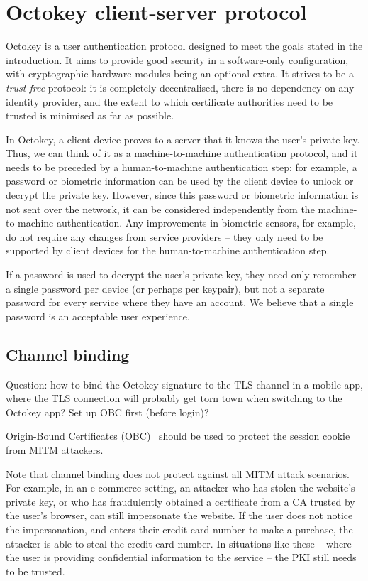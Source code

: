 \section{Octokey client-server protocol}

Octokey is a user authentication protocol designed to meet the goals stated in the introduction. It
aims to provide good security in a software-only configuration, with cryptographic hardware modules
being an optional extra. It strives to be a \emph{trust-free} protocol: it is completely
decentralised, there is no dependency on any identity provider, and the extent to which certificate
authorities need to be trusted is minimised as far as possible.

In Octokey, a client device proves to a server that it knows the user's private key. Thus, we can
think of it as a machine-to-machine authentication protocol, and it needs to be preceded by a
human-to-machine authentication step: for example, a password or biometric information can be used
by the client device to unlock or decrypt the private key. However, since this password or biometric
information is not sent over the network, it can be considered independently from the
machine-to-machine authentication. Any improvements in biometric sensors, for example, do not
require any changes from service providers -- they only need to be supported by client devices for
the human-to-machine authentication step.

If a password is used to decrypt the user's private key, they need only remember a single password
per device (or perhaps per keypair), but not a separate password for every service where they have
an account. We believe that a single password is an acceptable user experience.

\subsection{Channel binding}

Question: how to bind the Octokey signature to the TLS channel in a mobile app, where the TLS
connection will probably get torn town when switching to the Octokey app? Set up OBC first (before
login)?

Origin-Bound Certificates (OBC)~\cite{Dietz12} should be used to protect the session cookie from
MITM attackers.

Note that channel binding does not protect against all MITM attack scenarios. For example, in an
e-commerce setting, an attacker who has stolen the website's private key, or who has fraudulently
obtained a certificate from a CA trusted by the user's browser, can still impersonate the website.
If the user does not notice the impersonation, and enters their credit card number to make a
purchase, the attacker is able to steal the credit card number. In situations like these -- where
the user is providing confidential information to the service -- the PKI still needs to be trusted.

